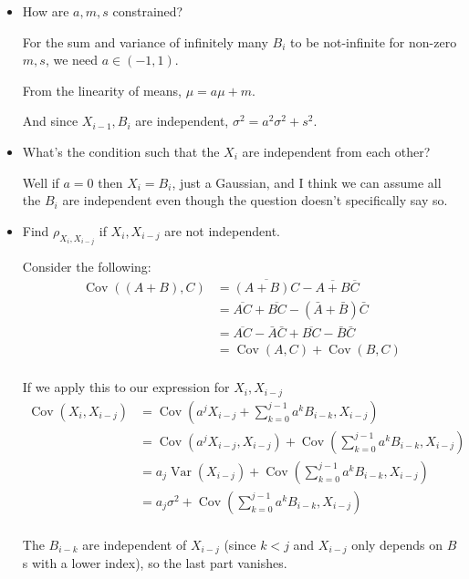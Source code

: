 \begin{itemize}
    \item How are $a,m,s$ constrained?
    
    For the sum and variance of infinitely many $B_i$ to be not-infinite for non-zero $m,s$, we need $a \in (-1,1)$.

    From the linearity of means, $\mu = a\mu + m$.

    And since $X_{i-1}, B_i$ are independent, $\sigma^2 = a^2\sigma^2 + s^2$.

    \item What's the condition such that the $X_i$ are independent from each other?

    Well if $a=0$ then $X_i = B_i$, just a Gaussian, and I think we can assume all the $B_i$ are independent even though the question doesn't specifically say so. 

    \item Find $\rho_{X_i,X_{i-j}}$ if $X_i,X_{i-j}$ are not independent.

    Consider the following:
    \begin{align*}
        \operatorname{Cov}((A+B), C) &= \overline{(A+B)C} - \overline{A+B}\overline{C} \\
        &= \overline{AC} + \overline{BC} - (\bar{A}+\bar{B})\bar{C} \\
        &= \overline{AC} - \bar{A}\bar{C} + \overline{BC} -\bar{B}\bar{C} \\
        &= \operatorname{Cov}(A,C) + \operatorname{Cov}(B,C) \\
    \end{align*}

    If we apply this to our expression for $X_i, X_{i-j}$
    \begin{align*}
        \operatorname{Cov}(X_i, X_{i-j}) &= \operatorname{Cov}(a^jX_{i-j} + \sum_{k=0}^{j-1}a^kB_{i-k}, X_{i-j}) \\
        &= \operatorname{Cov}(a^jX_{i-j}, X_{i-j}) + \operatorname{Cov}(\sum_{k=0}^{j-1}a^kB_{i-k}, X_{i-j}) \\
        &= a_j\operatorname{Var}(X_{i-j}) + \operatorname{Cov}(\sum_{k=0}^{j-1}a^kB_{i-k}, X_{i-j}) \\
        &= a_j\sigma^2 + \operatorname{Cov}(\sum_{k=0}^{j-1}a^kB_{i-k}, X_{i-j}) \\
    \end{align*}

    The $B_{i-k}$ are independent of $X_{i-j}$ (since $k < j$ and $X_{i-j}$ only depends on $B$s with a lower index), so the last part vanishes.


\end{itemize}
